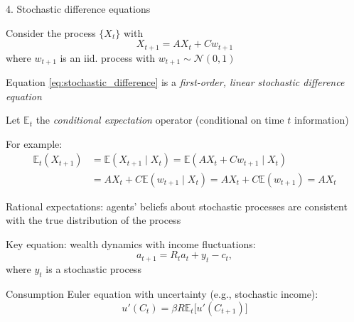 \documentclass[11pt, aspectratio=169]{beamer}
\newenvironment{witemize}{\itemize\addtolength{\itemsep}{10pt}}{\enditemize}
\begin{document}
\begin{frame}{4. Stochastic difference equations}
\begin{witemize}
\item Consider the process $\{X_t\}$ with 
\begin{equation}\label{eq:stochastic_difference}
	X_{t+1} = A X_t + Cw_{t+1}
\end{equation}
where $w_{t+1}$ is an iid. process with $w_{t+1} \sim \mathcal N(0, 1)$

\item Equation \eqref{eq:stochastic_difference} is a \textit{first-order, linear stochastic difference equation}

\item Let $\mathbb E_t$ the \textit{conditional expectation} operator (conditional on time $t$ information)

\item For example:
\begin{align*}
	\mathbb E_t(X_{t+1}) &= \mathbb E(X_{t+1} \mid X_t) = \mathbb E(A X_t + Cw_{t+1} \mid X_t) \\
	&= A X_t + C \mathbb E(w_{t+1} \mid X_t) = A X_t + C \mathbb E(w_{t+1}) = A X_t
\end{align*}
\end{witemize}
\end{frame}


\begin{frame}{}
\begin{witemize}
\item Rational expectations: agents' beliefs about stochastic processes are consistent with the true distribution of the process

\item Key equation: wealth dynamics with income fluctuations:
\begin{equation*}
	a_{t+1} = R_t a_t + y_t - c_t,
\end{equation*}
where $y_t$ is a stochastic process

\item Consumption Euler equation with uncertainty (e.g., stochastic income):
\begin{equation*}
	u'(C_t) = \beta R \mathbb E_t \Big[ u'(C_{t+1}) \Big]
\end{equation*}
\end{witemize}
\end{frame}
\end{document}
